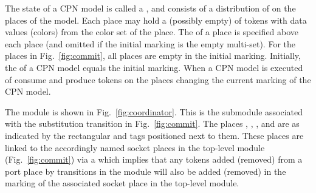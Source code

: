 
The state of a CPN model is called a , and consists
of a distribution of  on the places of the model. Each
place may hold a (possibly empty)  of tokens with
data values (colors) from the color set of the place. The
 of a place is specified above each place
(and omitted if the initial marking is the empty multi-set). For the
places in Fig.~\ref{fig:commit}, all places are empty in the initial
marking. Initially, the  of a CPN model
equals the initial marking. When a CPN model is executed
 of  consume and
produce tokens on the places changing the current marking of the CPN model.

 

The  module is shown in
Fig.~\ref{fig:coordinator}. This is the submodule associated with the
 substitution transition in
Fig.~\ref{fig:commit}. The places ,
, , and  are
 as indicated by the rectangular  and
 tags positioned next to them. These places are linked to
the accordingly named socket places in the top-level module
(Fig.~\ref{fig:commit}) via a  which
implies that any tokens added (removed) from a port place by
transitions in the  module will also be added
(removed) in the marking of the associated socket place in the
top-level module.

